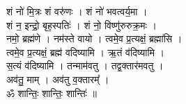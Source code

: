 शं नो॑ मि॒त्रः शं वरु॑णः । शं नो॑ भवत्वर्य॒मा ।\\
शं न॒ इन्द्रो॒ बृह॒स्पतिः॑ । शं नो॒ विष्णु॑रुरुक्र॒मः ।\\
नमो॒ ब्रह्म॑णे । नम॑स्ते वायो । त्वमे॒व प्र॒त्यक्षं॒ ब्रह्मा॑सि ।\\
त्वमे॒व प्र॒त्यक्षं॒ ब्रह्म॑ वदिष्यामि । ऋ॒तं व॑दिष्यामि ।\\
स॒त्यं व॑दिष्यामि । तन्माम॑वतु । तद्व॒क्तार॑मवतु ।\\
अव॑तु॒ माम् । अव॑तु व॒क्तारम्᳚ ।\\
ॐ शान्तिः॒ शान्तिः॒ शान्तिः॑ ॥\\